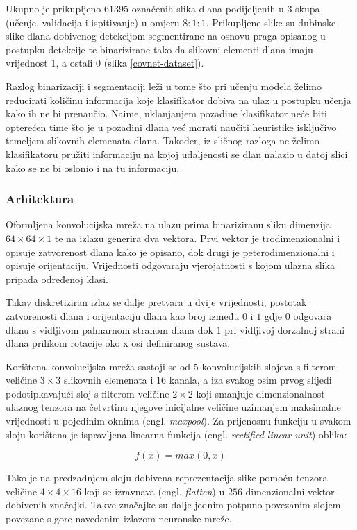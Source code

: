 \documentclass[times, utf8, diplomski, numeric]{fer}
\begin{document}
Ukupno je prikupljeno $61 395$ označenih slika dlana podijeljenih u 3 skupa (učenje, validacija i ispitivanje) u omjeru $8:1:1$. Prikupljene slike su dubinske slike dlana dobivenog detekcijom segmentirane na osnovu praga opisanog u postupku detekcije te binarizirane tako da slikovni elementi dlana imaju vrijednost $1$, a ostali $0$ (slika \ref{covnet-dataset}).

Razlog binarizaciji i segmentaciji leži u tome što pri učenju modela želimo reducirati količinu informacija koje klasifikator dobiva na ulaz u postupku učenja kako ih ne bi prenaučio. Naime, uklanjanjem pozadine klasifikator neće biti opterećen time što je u pozadini dlana već morati naučiti heuristike isključivo temeljem slikovnih elemenata dlana. Također, iz sličnog razloga ne želimo klasifikatoru pružiti informaciju na kojoj udaljenosti se dlan nalazio u datoj slici kako se ne bi oslonio i na tu informaciju.


\subsubsection{Arhitektura}\label{arhitektura-mreze}
Oformljena konvolucijska mreža na ulazu prima binariziranu sliku dimenzija $64\times64\times1$ te na izlazu generira dva vektora. Prvi vektor je trodimenzionalni i opisuje zatvorenost dlana kako je opisano, dok drugi je peterodimenzionalni i opisuje orijentaciju. Vrijednosti odgovaraju vjerojatnosti s kojom ulazna slika pripada određenoj klasi. 

Takav diskretiziran izlaz se dalje pretvara u dvije vrijednosti, postotak zatvorenosti dlana i orijentaciju dlana kao broj između $0$ i $1$ gdje $0$ odgovara dlanu s vidljivom palmarnom stranom dlana dok $1$ pri vidljivoj dorzalnoj strani dlana prilikom rotacije oko x osi definiranog sustava.

Korištena konvolucijska mreža sastoji se od 5 konvolucijskih slojeva s filterom veličine $3\times3$ slikovnih elemenata i $16$ kanala, a iza svakog osim prvog slijedi podotipkavajući sloj s filterom veličine $2\times2$ koji smanjuje dimenzionalnost ulaznog tenzora na četvrtinu njegove inicijalne veličine uzimanjem maksimalne vrijednosti u pojedinim oknima (engl. \textit{maxpool}). Za prijenosnu funkciju u svakom sloju korištena je ispravljena linearna funkcija (engl. \textit{rectified linear unit}) oblika:

$$f(x) = max(0,x)$$

Tako je na predzadnjem sloju dobivena reprezentacija slike pomoću tenzora veličine $4\times4\times16$ koji se izravnava (engl. \textit{flatten}) u $256$ dimenzionalni vektor dobivenih značajki. Takve značajke su dalje jednim potpuno povezanim slojem povezane s gore navedenim izlazom neuronske mreže.
\end{document}
